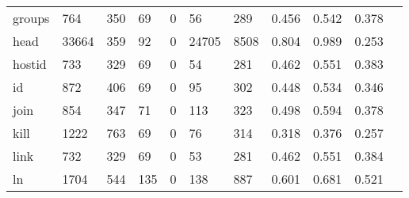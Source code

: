\begin{longtable}{lp{1.10cm}p{1.10cm}p{1.10cm}p{1.10cm}p{1.10cm}p{1.10cm}p{1.10cm}p{1.10cm}p{1.10cm}p{1.10cm}}
groups    &                    764 &                                350 &                                69 &                                0 &                                56 &                             289 &                          0.456 &                                 0.542 &                               0.378 \\
head      &                  33664 &                                359 &                                92 &                                0 &                             24705 &                            8508 &                          0.804 &                                 0.989 &                               0.253 \\
hostid    &                    733 &                                329 &                                69 &                                0 &                                54 &                             281 &                          0.462 &                                 0.551 &                               0.383 \\
id        &                    872 &                                406 &                                69 &                                0 &                                95 &                             302 &                          0.448 &                                 0.534 &                               0.346 \\
join      &                    854 &                                347 &                                71 &                                0 &                               113 &                             323 &                          0.498 &                                 0.594 &                               0.378 \\
kill      &                   1222 &                                763 &                                69 &                                0 &                                76 &                             314 &                          0.318 &                                 0.376 &                               0.257 \\
link      &                    732 &                                329 &                                69 &                                0 &                                53 &                             281 &                          0.462 &                                 0.551 &                               0.384 \\
ln        &                   1704 &                                544 &                               135 &                                0 &                               138 &                             887 &                          0.601 &                                 0.681 &                               0.521 \\

\end{longtable}
